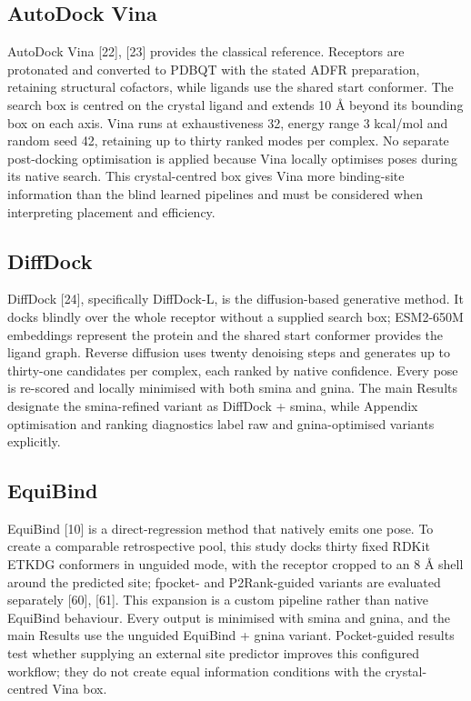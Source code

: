 \hypertarget{autodock-vina-2}{%
\subsection{AutoDock Vina}\label{autodock-vina-2}}

AutoDock Vina {[}22{]}, {[}23{]} provides the classical reference. Receptors are protonated and converted to PDBQT with the stated ADFR preparation, retaining structural cofactors, while ligands use the shared start conformer. The search box is centred on the crystal ligand and extends 10 Å beyond its bounding box on each axis. Vina runs at exhaustiveness 32, energy range 3 kcal/mol and random seed 42, retaining up to thirty ranked modes per complex. No separate post-docking optimisation is applied because Vina locally optimises poses during its native search. This crystal-centred box gives Vina more binding-site information than the blind learned pipelines and must be considered when interpreting placement and efficiency.

\hypertarget{diffdock-2}{%
\subsection{DiffDock}\label{diffdock-2}}

DiffDock {[}24{]}, specifically DiffDock-L, is the diffusion-based generative method. It docks blindly over the whole receptor without a supplied search box; ESM2-650M embeddings represent the protein and the shared start conformer provides the ligand graph. Reverse diffusion uses twenty denoising steps and generates up to thirty-one candidates per complex, each ranked by native confidence. Every pose is re-scored and locally minimised with both smina and gnina. The main Results designate the smina-refined variant as DiffDock + smina, while Appendix optimisation and ranking diagnostics label raw and gnina-optimised variants explicitly.

\hypertarget{equibind-2}{%
\subsection{EquiBind}\label{equibind-2}}

EquiBind {[}10{]} is a direct-regression method that natively emits one pose. To create a comparable retrospective pool, this study docks thirty fixed RDKit ETKDG conformers in unguided mode, with the receptor cropped to an 8 Å shell around the predicted site; fpocket- and P2Rank-guided variants are evaluated separately {[}60{]}, {[}61{]}. This expansion is a custom pipeline rather than native EquiBind behaviour. Every output is minimised with smina and gnina, and the main Results use the unguided EquiBind + gnina variant. Pocket-guided results test whether supplying an external site predictor improves this configured workflow; they do not create equal information conditions with the crystal-centred Vina box.

